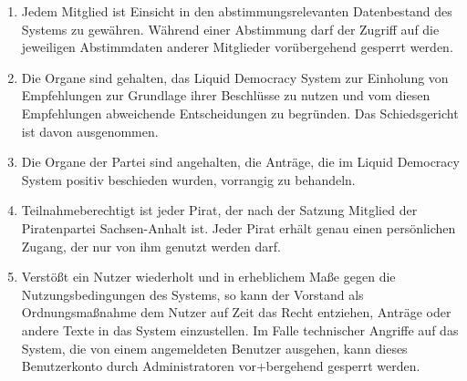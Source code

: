 \documentclass[draft,a4paper,10pt]{article}
\begin{document}
\begin{enumerate}
\item Jedem Mitglied ist Einsicht in den abstimmungsrelevanten Datenbestand des
Systems zu gewähren. Während einer Abstimmung darf der Zugriff auf die
jeweiligen Abstimmdaten anderer Mitglieder vorübergehend gesperrt werden.

\item Die Organe sind gehalten, das Liquid Democracy System zur Einholung von
Empfehlungen zur Grundlage ihrer Beschlüsse zu nutzen und vom diesen
Empfehlungen abweichende Entscheidungen zu begründen. Das Schiedsgericht ist
davon ausgenommen.

\item Die Organe der Partei sind angehalten, die Anträge, die im Liquid
Democracy System positiv beschieden wurden, vorrangig zu behandeln.

\item Teilnahmeberechtigt ist jeder Pirat, der nach der Satzung Mitglied der
Piratenpartei Sachsen-Anhalt ist. Jeder Pirat erhält genau einen persönlichen
Zugang, der nur von ihm genutzt werden darf.

\item Verstößt ein Nutzer wiederholt und in erheblichem Maße gegen die
Nutzungsbedingungen des Systems, so kann der Vorstand als Ordnungsmaßnahme dem
Nutzer auf Zeit das Recht entziehen, Anträge oder andere Texte in das System
einzustellen. Im Falle technischer Angriffe auf das System, die von einem
angemeldeten Benutzer ausgehen, kann dieses Benutzerkonto durch Administratoren
vor+bergehend gesperrt werden.
\end{enumerate}
\end{document}
